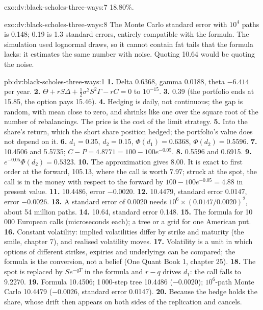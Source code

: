 \begin{solution}{exo:dv:black-scholes-three-ways:7}
18.80\%.
\end{solution}

\begin{solution}{exo:dv:black-scholes-three-ways:8}
The Monte Carlo standard error with $10^4$ paths is 0.148; 0.19 is 1.3 standard
errors, entirely compatible with the formula. The simulation used lognormal
draws, so it cannot contain fat tails that the formula lacks: it estimates the
same number with noise. Quoting 10.64 would be quoting the noise.
\end{solution}

\begin{solution}{pb:dv:black-scholes-three-ways:1}
\textbf{1.} Delta 0.6368, gamma 0.0188, theta $-6.414$ per year.
\textbf{2.} $\Theta+rS\Delta+\tfrac12\sigma^2S^2\Gamma-rC=0$ to $10^{-15}$.
\textbf{3.} 0.39 (the portfolio ends at 15.85, the option pays 15.46).
\textbf{4.} Hedging is daily, not continuous; the gap is random, with mean close to
zero, and shrinks like one over the square root of the number of rebalancings.
The price is the cost of the limit strategy.
\textbf{5.} Into the share's return, which the short share position hedged; the
portfolio's value does not depend on it.
\textbf{6.} $d_1=0.35$, $d_2=0.15$, $\Phi(d_1)=0.6368$, $\Phi(d_2)=0.5596$.
\textbf{7.} 10.4506 and 5.5735; $C-P=4.8771=100-100e^{-0.05}$.
\textbf{8.} 0.5596 and 0.6915.
\textbf{9.} $e^{-0.05}\Phi(d_2)=0.5323$.
\textbf{10.} The approximation gives 8.00. It is exact to first order at the forward,
105.13, where the call is worth 7.97; struck at the spot, the call is in the money
with respect to the forward by $100-100e^{-0.05}=4.88$ in present value.
\textbf{11.} 10.4486, error $-0.0020$.
\textbf{12.} 10.4479, standard error 0.0147, error $-0.0026$.
\textbf{13.} A standard error of 0.0020 needs $10^6\times(0.0147/0.0020)^2$, about 54
million paths.
\textbf{14.} 10.64, standard error 0.148.
\textbf{15.} The formula for 10\,000 European calls (microseconds each); a tree or a grid
for one American put.
\textbf{16.} Constant volatility: implied volatilities differ by strike and maturity
(the smile, chapter 7), and realised volatility moves.
\textbf{17.} Volatility is a unit in which options of different strikes, expiries and
underlyings can be compared; the formula is the conversion, not a belief
(One Quant Book 1, chapter 25).
\textbf{18.} The spot is replaced by $Se^{-qT}$ in the formula and $r-q$ drives $d_1$:
the call falls to 9.2270.
\textbf{19.} Formula 10.4506; 1\,000-step tree 10.4486 ($-0.0020$); $10^6$-path Monte
Carlo 10.4479 ($-0.0026$, standard error 0.0147).
\textbf{20.} Because the hedge holds the share, whose drift then appears on both
sides of the replication and cancels.
\end{solution}

